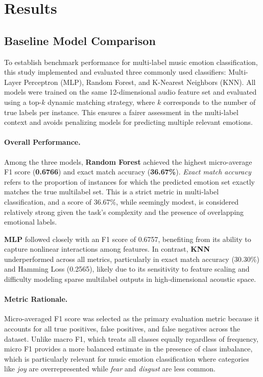 \documentclass{article}
\begin{document}
\section{Results}
\subsection{Baseline Model Comparison}

To establish benchmark performance for multi-label music emotion classification, this study implemented and evaluated three commonly used classifiers: Multi-Layer Perceptron (MLP), Random Forest, and K-Nearest Neighbors (KNN). All models were trained on the same 12-dimensional audio feature set and evaluated using a top-$k$ dynamic matching strategy, where $k$ corresponds to the number of true labels per instance. This ensures a fairer assessment in the multi-label context and avoids penalizing models for predicting multiple relevant emotions.

\paragraph{Overall Performance.}
Among the three models, \textbf{Random Forest} achieved the highest micro-average F1 score (\textbf{0.6766}) and exact match accuracy (\textbf{36.67\%}). \textit{Exact match accuracy} refers to the proportion of instances for which the predicted emotion set exactly matches the true multilabel set. This is a strict metric in multi-label classification, and a score of 36.67\%, while seemingly modest, is considered relatively strong given the task's complexity and the presence of overlapping emotional labels.

\textbf{MLP} followed closely with an F1 score of 0.6757, benefiting from its ability to capture nonlinear interactions among features. In contrast, \textbf{KNN} underperformed across all metrics, particularly in exact match accuracy (30.30\%) and Hamming Loss (0.2565), likely due to its sensitivity to feature scaling and difficulty modeling sparse multilabel outputs in high-dimensional acoustic space.

\paragraph{Metric Rationale.}
Micro-averaged F1 score was selected as the primary evaluation metric because it accounts for all true positives, false positives, and false negatives across the dataset. Unlike macro F1, which treats all classes equally regardless of frequency, micro F1 provides a more balanced estimate in the presence of class imbalance, which is particularly relevant for music emotion classification where categories like \textit{joy} are overrepresented while \textit{fear} and \textit{disgust} are less common.
\end{document}
